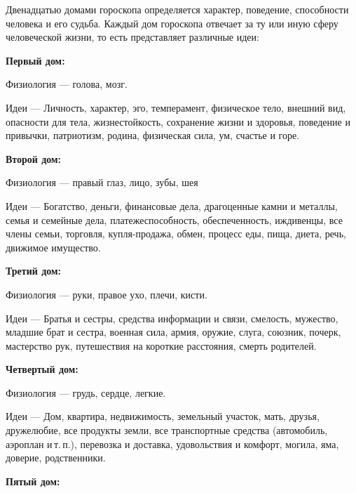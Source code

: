 Двенадцатью домами гороскопа определяется характер, поведение, способности человека и его судьба. Каждый дом гороскопа отвечает за ту или иную сферу человеческой жизни, то есть представляет различные идеи:

\begin{myenum}
	\item \textbf{Первый дом:}
		\begin{mydescr}
			\item[Физиология] --- голова, мозг.
			\item[Идеи] --- Личность, характер, эго, темперамент, физическое тело, внешний вид, опасности для тела, жизнестойкость, сохранение жизни и здоровья, поведение и привычки, патриотизм, родина, физическая сила, ум, счастье и горе.
		\end{mydescr}
	\item \textbf{Второй дом:}
		\begin{mydescr}
			\item[Физиология] --- правый глаз, лицо, зубы, шея
			\item[Идеи] --- Богатство, деньги, финансовые дела, драгоценные камни и металлы, семья и семейные дела, платежеспособность, обеспеченность, иждивенцы, все члены семьи, торговля, купля-продажа, обмен, процесс еды, пища, диета, речь, движимое имущество.
		\end{mydescr}
	\item \textbf{Третий дом:}
		\begin{mydescr}
			\item[Физиология] --- руки, правое ухо, плечи, кисти.
			\item[Идеи] --- Братья и сестры, средства информации и связи, смелость, мужество, младшие брат и сестра, военная сила, армия, оружие, слуга, союзник, почерк, мастерство рук, путешествия на короткие расстояния, смерть родителей.
		\end{mydescr}
	\item \textbf{Четвертый дом:}
		\begin{mydescr}
			\item[Физиология] --- грудь, сердце, легкие.
			\item[Идеи] --- Дом, квартира, недвижимость, земельный участок, мать, друзья, дружелюбие, все продукты земли, все транспортные средства (автомобиль, аэроплан и\,т.\,п.), перевозка и доставка, удовольствия и комфорт, могила, яма, доверие, родственники.
		\end{mydescr}
	\item \textbf{Пятый дом:}
		\begin{mydescr}

\end{mydescr}
\end{myenum}

